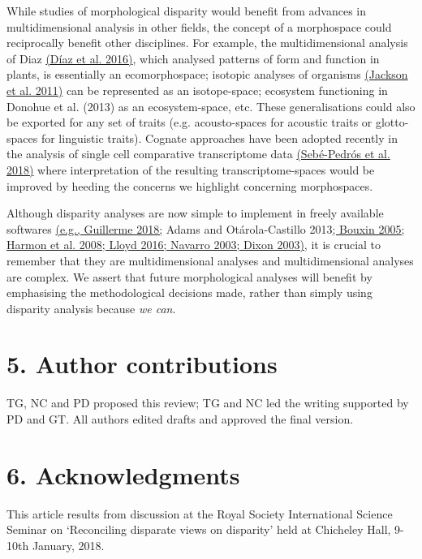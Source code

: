 While studies of morphological disparity would benefit from advances in
multidimensional analysis in other fields, the concept of a morphospace
could reciprocally benefit other disciplines. For example, the
multidimensional analysis of Diaz
\href{https://paperpile.com/c/sTGYvp/47fI}{(Díaz et al. 2016)}, which
analysed patterns of form and function in plants, is essentially an
ecomorphospace; isotopic analyses of organisms
\href{https://paperpile.com/c/sTGYvp/PwyQ}{(Jackson et al. 2011)} can be
represented as an isotope-space; ecosystem functioning in Donohue et al.
(2013) as an ecosystem-space, etc. These generalisations could also be
exported for any set of traits (e.g. acousto-spaces for acoustic traits
or glotto-spaces for linguistic traits). Cognate approaches have been
adopted recently in the analysis of single cell comparative
transcriptome data
\href{https://paperpile.com/c/sTGYvp/856K}{(Sebé-Pedrós et al. 2018)}
where interpretation of the resulting transcriptome-spaces would be
improved by heeding the concerns we highlight concerning morphospaces.

Although disparity analyses are now simple to implement in freely
available softwares
\href{https://paperpile.com/c/sTGYvp/xDqf+J2G1+9JdS+9Zoi+bCsU+EmTR+2KmX}{(e.g.,
Guillerme 2018;} Adams and Otárola-Castillo
2013\href{https://paperpile.com/c/sTGYvp/xDqf+J2G1+9JdS+9Zoi+bCsU+EmTR+2KmX}{;
Bouxin 2005; Harmon et al. 2008; Lloyd 2016; Navarro 2003; Dixon 2003)},
it is crucial to remember that they are multidimensional analyses and
multidimensional analyses are complex. We assert that future
morphological analyses will benefit by emphasising the methodological
decisions made, rather than simply using disparity analysis because
\emph{we can}.

\hypertarget{author-contributions}{%
\section{5. Author contributions}\label{author-contributions}}

TG, NC and PD proposed this review; TG and NC led the writing supported
by PD and GT. All authors edited drafts and approved the final version.

\hypertarget{acknowledgments}{%
\section{6. Acknowledgments}\label{acknowledgments}}

This article results from discussion at the Royal Society International
Science Seminar on `Reconciling disparate views on disparity' held at
Chicheley Hall, 9-10th January, 2018.

